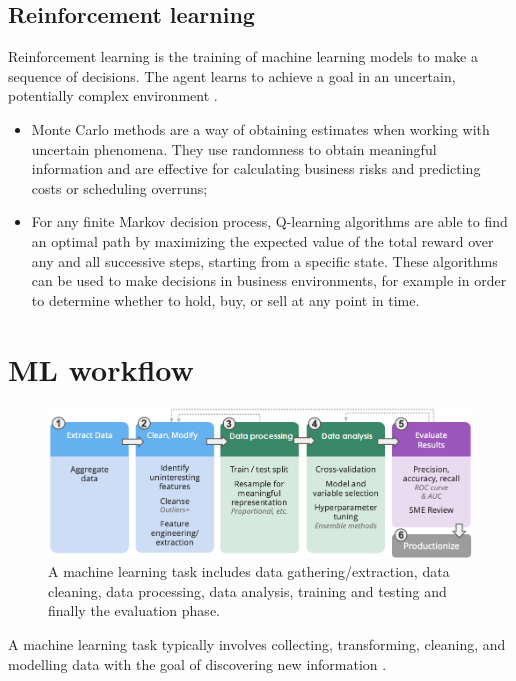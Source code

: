 \subsection{Reinforcement learning}
Reinforcement learning is the training of machine learning models to make a sequence of decisions. The agent learns to achieve a goal in an uncertain, potentially complex environment \cite{reinforcementlearning}.
\begin{itemize} 
	\item Monte Carlo methods are a way of obtaining estimates when working with uncertain phenomena. They use randomness to obtain meaningful information and are effective for calculating business risks and predicting costs or scheduling overruns;
	\item For any finite Markov decision process, Q-learning algorithms are able to find an optimal path by maximizing the expected value of the total reward over any and all successive steps, starting from a specific state. These algorithms can be used to make decisions in business environments, for example in order to determine whether to hold, buy, or sell at any point in time.
\end{itemize}

\newpage
\section{ML workflow}

\begin{figure}[H]
	\centering
	\includegraphics[scale=0.8]{img/mlworkflow.png}
	\caption{A machine learning task includes data gathering/extraction, data cleaning, data processing, data analysis, training and testing and finally the evaluation phase.}
	\label{Literature Review:Machine Learning}
\end{figure} 

A machine learning task typically involves collecting, transforming, cleaning, and modelling data with the goal of discovering new information \cite{mlworkflow}.



